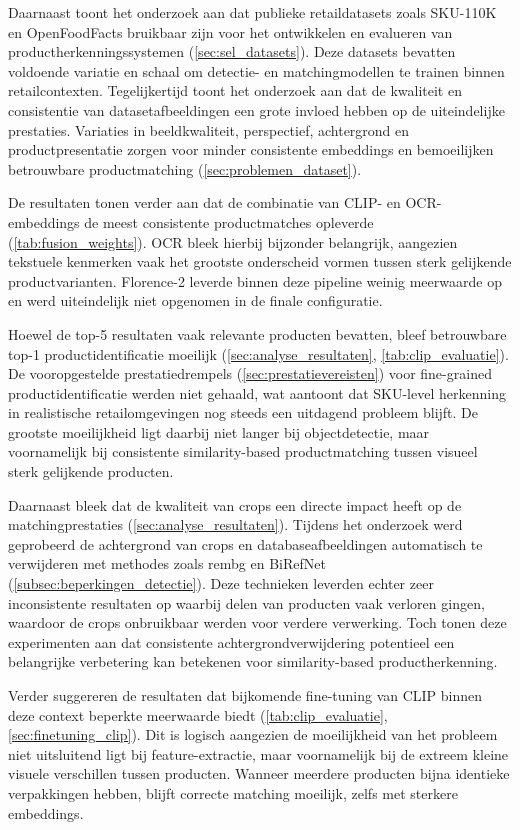 Daarnaast toont het onderzoek aan dat publieke retaildatasets zoals SKU-110K en OpenFoodFacts bruikbaar zijn voor het ontwikkelen en evalueren van productherkenningssystemen (\ref{sec:sel_datasets}). Deze datasets bevatten voldoende variatie en schaal om detectie- en matchingmodellen te trainen binnen retailcontexten. Tegelijkertijd toont het onderzoek aan dat de kwaliteit en consistentie van datasetafbeeldingen een grote invloed hebben op de uiteindelijke prestaties. Variaties in beeldkwaliteit, perspectief, achtergrond en productpresentatie zorgen voor minder consistente embeddings en bemoeilijken betrouwbare productmatching (\ref{sec:problemen_dataset}).

De resultaten tonen verder aan dat de combinatie van CLIP- en OCR-embeddings de meest consistente productmatches opleverde (\ref{tab:fusion_weights}). OCR bleek hierbij bijzonder belangrijk, aangezien tekstuele kenmerken vaak het grootste onderscheid vormen tussen sterk gelijkende productvarianten. Florence-2 leverde binnen deze pipeline weinig meerwaarde op en werd uiteindelijk niet opgenomen in de finale configuratie.

Hoewel de top-5 resultaten vaak relevante producten bevatten, bleef betrouwbare top-1 productidentificatie moeilijk (\ref{sec:analyse_resultaten}, \ref{tab:clip_evaluatie}). De vooropgestelde prestatiedrempels (\ref{sec:prestatievereisten}) voor fine-grained productidentificatie werden niet gehaald, wat aantoont dat SKU-level herkenning in realistische retailomgevingen nog steeds een uitdagend probleem blijft. De grootste moeilijkheid ligt daarbij niet langer bij objectdetectie, maar voornamelijk bij consistente similarity-based productmatching tussen visueel sterk gelijkende producten.

Daarnaast bleek dat de kwaliteit van crops een directe impact heeft op de matchingprestaties (\ref{sec:analyse_resultaten}). Tijdens het onderzoek werd geprobeerd de achtergrond van crops en databaseafbeeldingen automatisch te verwijderen met methodes zoals rembg en BiRefNet (\ref{subsec:beperkingen_detectie}). Deze technieken leverden echter zeer inconsistente resultaten op waarbij delen van producten vaak verloren gingen, waardoor de crops onbruikbaar werden voor verdere verwerking. Toch tonen deze experimenten aan dat consistente achtergrondverwijdering potentieel een belangrijke verbetering kan betekenen voor similarity-based productherkenning.

Verder suggereren de resultaten dat bijkomende fine-tuning van CLIP binnen deze context beperkte meerwaarde biedt (\ref{tab:clip_evaluatie}, \ref{sec:finetuning_clip}). Dit is logisch aangezien de moeilijkheid van het probleem niet uitsluitend ligt bij feature-extractie, maar voornamelijk bij de extreem kleine visuele verschillen tussen producten. Wanneer meerdere producten bijna identieke verpakkingen hebben, blijft correcte matching moeilijk, zelfs met sterkere embeddings.

